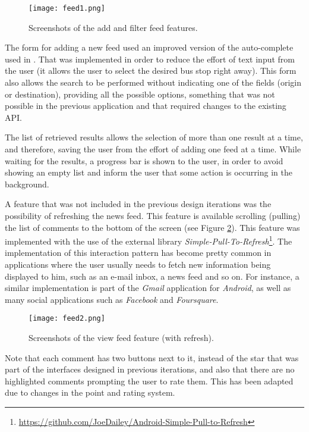 \begin{figure}[!h]
  \begin{center}
    \leavevmode
    \texttt{[image: feed1.png]}
    \caption{Screenshots of the add and filter feed features.}
    \label{fig:feed1}
  \end{center}
\end{figure}

The form for adding a new feed used an improved version of the auto-complete used in \cite{kn:eSG12}. That was implemented in order to reduce the effort of text input from the user (it allows the user to select the desired bus stop right away). This form also allows the search to be performed without indicating one of the fields (origin or destination), providing all the possible options, something that was not possible in the previous application and that required changes to the existing API.

The list of retrieved results allows the selection of more than one result at a time, and therefore, saving the user from the effort of adding one feed at a time.
While waiting for the results, a progress bar is shown to the user, in order to avoid showing an empty list and inform the user that some action is occurring in the background.

A feature that was not included in the previous design iterations was the possibility of refreshing the news feed. This feature is available scrolling (pulling) the list of comments to the bottom of the screen (see Figure \ref{fig:feed2}). This feature was implemented with the use of the external library \emph{Simple-Pull-To-Refresh}\footnote{\url{https://github.com/JoeDailey/Android-Simple-Pull-to-Refresh}}. The implementation of this interaction pattern has become pretty common in applications where the user usually needs to fetch new information being displayed to him, such as an e-mail inbox, a news feed and so on. For instance, a similar implementation is part of the \emph{Gmail} application for \emph{Android}, as well as many social applications such as \emph{Facebook} and \emph{Foursquare}. 

\begin{figure}[!h]
  \begin{center}
    \leavevmode
    \texttt{[image: feed2.png]}
    \caption{Screenshots of the view feed feature (with refresh).}
    \label{fig:feed2}
  \end{center}
\end{figure}


Note that each comment has two buttons next to it, instead of the star that was part of the interfaces designed in previous iterations, and also that there are no highlighted comments prompting the user to rate them. This has been adapted due to changes in the point and rating system.

